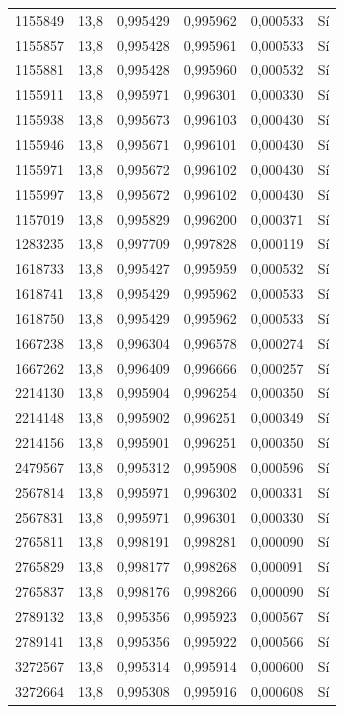 \begin{longtable}{lccccc}
1155849 & 13,8 & 0,995429 & 0,995962 & 0,000533 & Sí \\
1155857 & 13,8 & 0,995428 & 0,995961 & 0,000533 & Sí \\
1155881 & 13,8 & 0,995428 & 0,995960 & 0,000532 & Sí \\
1155911 & 13,8 & 0,995971 & 0,996301 & 0,000330 & Sí \\
1155938 & 13,8 & 0,995673 & 0,996103 & 0,000430 & Sí \\
1155946 & 13,8 & 0,995671 & 0,996101 & 0,000430 & Sí \\
1155971 & 13,8 & 0,995672 & 0,996102 & 0,000430 & Sí \\
1155997 & 13,8 & 0,995672 & 0,996102 & 0,000430 & Sí \\
1157019 & 13,8 & 0,995829 & 0,996200 & 0,000371 & Sí \\
1283235 & 13,8 & 0,997709 & 0,997828 & 0,000119 & Sí \\
1618733 & 13,8 & 0,995427 & 0,995959 & 0,000532 & Sí \\
1618741 & 13,8 & 0,995429 & 0,995962 & 0,000533 & Sí \\
1618750 & 13,8 & 0,995429 & 0,995962 & 0,000533 & Sí \\
1667238 & 13,8 & 0,996304 & 0,996578 & 0,000274 & Sí \\
1667262 & 13,8 & 0,996409 & 0,996666 & 0,000257 & Sí \\
2214130 & 13,8 & 0,995904 & 0,996254 & 0,000350 & Sí \\
2214148 & 13,8 & 0,995902 & 0,996251 & 0,000349 & Sí \\
2214156 & 13,8 & 0,995901 & 0,996251 & 0,000350 & Sí \\
2479567 & 13,8 & 0,995312 & 0,995908 & 0,000596 & Sí \\
2567814 & 13,8 & 0,995971 & 0,996302 & 0,000331 & Sí \\
2567831 & 13,8 & 0,995971 & 0,996301 & 0,000330 & Sí \\
2765811 & 13,8 & 0,998191 & 0,998281 & 0,000090 & Sí \\
2765829 & 13,8 & 0,998177 & 0,998268 & 0,000091 & Sí \\
2765837 & 13,8 & 0,998176 & 0,998266 & 0,000090 & Sí \\
2789132 & 13,8 & 0,995356 & 0,995923 & 0,000567 & Sí \\
2789141 & 13,8 & 0,995356 & 0,995922 & 0,000566 & Sí \\
3272567 & 13,8 & 0,995314 & 0,995914 & 0,000600 & Sí \\
3272664 & 13,8 & 0,995308 & 0,995916 & 0,000608 & Sí \\

\end{longtable}
